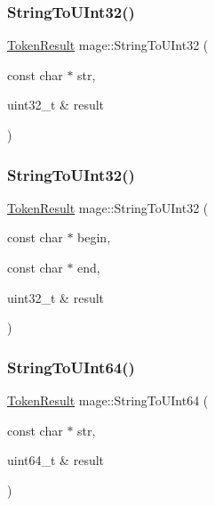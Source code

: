 \hypertarget{namespacemage_ac4f6357454f6870506e0fc102b745281}{}\label{namespacemage_ac4f6357454f6870506e0fc102b745281} 
\subsubsection{\texorpdfstring{String\+To\+U\+Int32()}{StringToUInt32()}\hspace{0.1cm}{\footnotesize\ttfamily [1/2]}}
{\footnotesize\ttfamily \hyperlink{namespacemage_a2178ba2411db5912f41b2e7698c2037d}{Token\+Result} mage\+::\+String\+To\+U\+Int32 (\begin{DoxyParamCaption}\item[{const char $\ast$}]{str,  }\item[{uint32\+\_\+t \&}]{result }\end{DoxyParamCaption})}

\hypertarget{namespacemage_ad84d36f8aaa4376d26b79a2fbd8fe22a}{}\label{namespacemage_ad84d36f8aaa4376d26b79a2fbd8fe22a} 
\subsubsection{\texorpdfstring{String\+To\+U\+Int32()}{StringToUInt32()}\hspace{0.1cm}{\footnotesize\ttfamily [2/2]}}
{\footnotesize\ttfamily \hyperlink{namespacemage_a2178ba2411db5912f41b2e7698c2037d}{Token\+Result} mage\+::\+String\+To\+U\+Int32 (\begin{DoxyParamCaption}\item[{const char $\ast$}]{begin,  }\item[{const char $\ast$}]{end,  }\item[{uint32\+\_\+t \&}]{result }\end{DoxyParamCaption})}

\hypertarget{namespacemage_a9ed31e3340a769a654f1f819c368bb6d}{}\label{namespacemage_a9ed31e3340a769a654f1f819c368bb6d} 
\subsubsection{\texorpdfstring{String\+To\+U\+Int64()}{StringToUInt64()}\hspace{0.1cm}{\footnotesize\ttfamily [1/2]}}
{\footnotesize\ttfamily \hyperlink{namespacemage_a2178ba2411db5912f41b2e7698c2037d}{Token\+Result} mage\+::\+String\+To\+U\+Int64 (\begin{DoxyParamCaption}\item[{const char $\ast$}]{str,  }\item[{uint64\+\_\+t \&}]{result }\end{DoxyParamCaption})}

